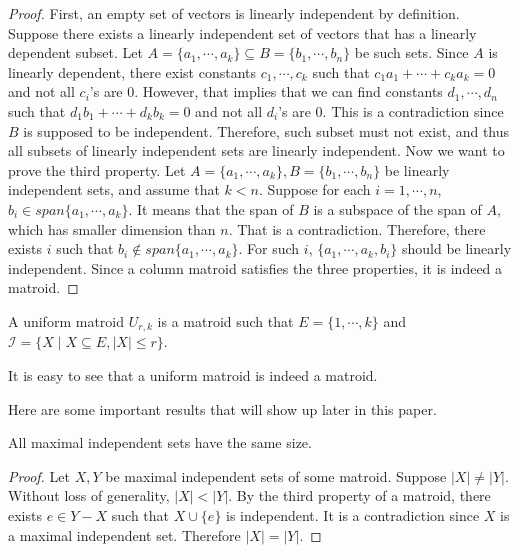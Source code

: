 \begin{proof}
First, an empty set of vectors is linearly independent by definition.
Suppose there exists a linearly independent set of vectors that has a linearly dependent subset.
Let $A = \{a_1, \cdots, a_k\} \subseteq B = \{b_1, \cdots, b_n\}$ be such sets.
Since $A$ is linearly dependent, there exist constants $c_1, \cdots, c_k$ such that $c_1 a_1 + \cdots + c_k a_k = 0$ and not all $c_i$'s are $0$.
However, that implies that we can find constants $d_1, \cdots, d_n$ such that $d_1 b_1 + \cdots + d_k b_k = 0$ and not all $d_i$'s are $0$.
This is a contradiction since $B$ is supposed to be independent.
Therefore, such subset must not exist, and thus all subsets of linearly independent sets are linearly independent.
Now we want to prove the third property.
Let $A = \{a_1, \cdots, a_k\}, B = \{b_1, \cdots, b_n\}$ be linearly independent sets, and assume that $k < n$.
Suppose for each $i = 1, \cdots, n$, $b_i \in span\{ a_1, \cdots, a_k \}$.
It means that the span of $B$ is a subspace of the span of $A$, which has smaller dimension than $n$.
That is a contradiction.
Therefore, there exists $i$ such that $b_i \notin span \{ a_1, \cdots, a_k \}$.
For such $i$, $\{ a_1, \cdots, a_k, b_i \}$ should be linearly independent.
Since a column matroid satisfies the three properties, it is indeed a matroid.
\end{proof}


\begin{defn}
A uniform matroid $U_{r, k}$ is a matroid such that $E = \{ 1, \cdots, k \}$ and $\mathcal{I} = \{ X \mid  X \subseteq E, \lvert X \rvert \leq r \}$.
\end{defn}

It is easy to see that a uniform matroid is indeed a matroid.


Here are some important results that will show up later in this paper.

\begin{thm}
All maximal independent sets have the same size.
\end{thm}

\begin{proof}
Let $X, Y$ be maximal independent sets of some matroid.
Suppose $\lvert X \rvert \neq \lvert Y \rvert$.
Without loss of generality, $\lvert X \rvert < \lvert Y \rvert$.
By the third property of a matroid, there exists $e \in Y - X$ such that $X \cup \{ e \}$ is independent.
It is a contradiction since $X$ is a maximal independent set.
Therefore $\lvert X \rvert = \lvert Y \rvert$.
\end{proof}

